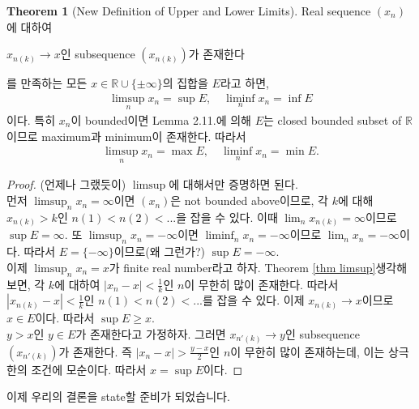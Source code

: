 \documentclass[12pt]{article}
\theoremstyle{definition}
\newtheorem{thm}{Theorem}[section]
\def\RR{\mathbb{R}}
\newcommand{\abs}[1]{\left\vert#1\right\vert}
\begin{document}
	\begin{thm}[New Definition of Upper and Lower Limits] \label{limsup}
		Real sequence \((x_n)\)에 대하여
		\begin{center}
			\(x_{n(k)} \rightarrow x\)인 subsequence \((x_{n(k)})\)가 존재한다
		\end{center}
		를 만족하는 모든 \(x \in \RR \cup \{\pm \infty\}\)의 집합을 \(E\)라고 하면,
		\begin{align*}
			\limsup_n x_n = \sup E, \quad \liminf_n x_n = \inf E
		\end{align*}
		이다. 특히 \(x_n\)이 bounded이면 Lemma 2.11.에 의해 \(E\)는 closed bounded subset of \(\RR\)이므로 maximum과 minimum이 존재한다. 따라서
		\begin{align*}
			\limsup_n x_n = \max E, \quad \liminf_n x_n = \min E.
		\end{align*}
	\end{thm}
	\begin{proof}
		(언제나 그랬듯이) \(\limsup\)에 대해서만 증명하면 된다.\\
		먼저 \(\limsup_n x_n = \infty\)이면 \((x_n)\)은 not bounded above이므로, 각 \(k\)에 대해 \(x_{n(k)} > k\)인 \(n(1) < n(2) < ...\)을 잡을 수 있다. 이때 \(\lim_n x_{n(k)} = \infty\)이므로 \(\sup E = \infty\). 또 \(\limsup_n x_n = -\infty\)이면 \(\liminf_n x_n = -\infty\)이므로 \(\lim_n x_n = -\infty\)이다. 따라서 \(E = \{-\infty\}\)이므로(왜 그런가?) \(\sup E = -\infty\).\\
		이제 \(\limsup_n x_n = x\)가 finite real number라고 하자. Theorem \ref{thm limsup}\을 생각해 보면, 각 \(k\)에 대하여 \(\abs{x_n - x} < \frac{1}{k}\)인 \(n\)이 무한히 많이 존재한다. 따라서 \(\abs{x_{n(k)} - x} < \frac{1}{k}\)인 \(n(1) < n(2) < ...\)를 잡을 수 있다. 이제 \(x_{n(k)} \rightarrow x\)이므로 \(x \in E\)이다. 따라서 \(\sup E \ge x\).\\
		\(y > x\)인 \(y \in E\)가 존재한다고 가정하자. 그러면 \(x_{n'(k)} \rightarrow y\)인 subsequence \((x_{n'(k)})\)가 존재한다. 즉 \(\abs{x_n - x} > \frac{y-x}{2}\)인 \(n\)이 무한히 많이 존재하는데, 이는 상극한의 조건에 모순이다. 따라서 \(x = \sup E\)이다.
	\end{proof}

이제 우리의 결론을 state할 준비가 되었습니다.
\end{document}

